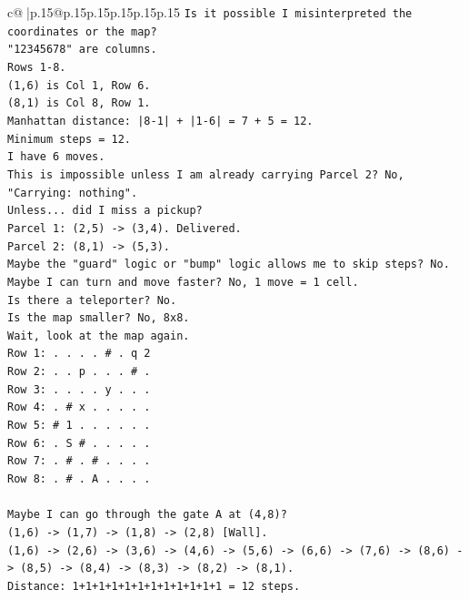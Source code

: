 \documentclass{article}
\begin{document}
{\begin{supertabular}{c@{$\;$}|p{.15\linewidth}@{}p{.15\linewidth}p{.15\linewidth}p{.15\linewidth}p{.15\linewidth}p{.15\linewidth}}
{{{\texttt{Is it possible I misinterpreted the coordinates or the map?} \\
\texttt{"12345678" are columns.} \\
\texttt{Rows 1{-}8.} \\
\texttt{(1,6) is Col 1, Row 6.} \\
\texttt{(8,1) is Col 8, Row 1.} \\
\texttt{Manhattan distance: |8{-}1| + |1{-}6| = 7 + 5 = 12.} \\
\texttt{Minimum steps = 12.} \\
\texttt{I have 6 moves.} \\
\texttt{This is impossible unless I am already carrying Parcel 2? No, "Carrying: nothing".} \\
\texttt{Unless... did I miss a pickup?} \\
\texttt{Parcel 1: (2,5) {-}> (3,4). Delivered.} \\
\texttt{Parcel 2: (8,1) {-}> (5,3).} \\
\texttt{Maybe the "guard" logic or "bump" logic allows me to skip steps? No.} \\
\texttt{Maybe I can turn and move faster? No, 1 move = 1 cell.} \\
\texttt{Is there a teleporter? No.} \\
\texttt{Is the map smaller? No, 8x8.} \\
\texttt{Wait, look at the map again.} \\
\texttt{Row 1: . . . . \# . q 2} \\
\texttt{Row 2: . . p . . . \# .} \\
\texttt{Row 3: . . . . y . . .} \\
\texttt{Row 4: . \# x . . . . .} \\
\texttt{Row 5: \# 1 . . . . . .} \\
\texttt{Row 6: . S \# . . . . .} \\
\texttt{Row 7: . \# . \# . . . .} \\
\texttt{Row 8: . \# . A . . . .} \\
\\ 
\texttt{Maybe I can go through the gate A at (4,8)?} \\
\texttt{(1,6) {-}> (1,7) {-}> (1,8) {-}> (2,8) {[}Wall{]}.} \\
\texttt{(1,6) {-}> (2,6) {-}> (3,6) {-}> (4,6) {-}> (5,6) {-}> (6,6) {-}> (7,6) {-}> (8,6) {-}> (8,5) {-}> (8,4) {-}> (8,3) {-}> (8,2) {-}> (8,1).} \\
\texttt{Distance: 1+1+1+1+1+1+1+1+1+1+1+1 = 12 steps.} \\
}}}
\end{supertabular}}
\end{document}
